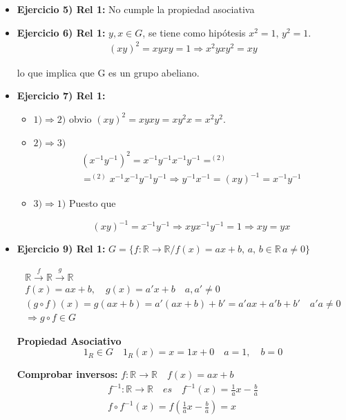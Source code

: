 \documentclass{article}
\begin{document}
\begin{itemize}
\item \textbf{Ejercicio 5) Rel 1:} No cumple la propiedad asociativa
\item \textbf{Ejercicio 6) Rel 1:} $y,x\in G$, se tiene como hipótesis $x^2=1,\, y^2=1$. \\

\begin{gather*}
(xy)^2=xyxy=1 \Rightarrow x^2yxy^2=xy
\end{gather*}

lo que implica que G es un grupo abeliano.

\item \textbf{Ejercicio 7) Rel 1:}
\begin{itemize}
\item $1)\Rightarrow 2)$ obvio $(xy)^2=xyxy=xy^2x=x^2y^2$.
\item $2)\Rightarrow 3)$
	\begin{gather*}
	(x^{-1}y^{-1})^2=x^{-1}y^{-1}x^{-1}y^{-1}=^{(2)} \\
=^{(2)}x^{-1}x^{-1}y^{-1}y^{-1} \Rightarrow y^{-1}x^{-1}=(xy)^{-1}=x^{-1}y^{-1}
	\end{gather*}
\item $3)\Rightarrow 1)$ Puesto que

\begin{equation*}
(xy)^{-1}=x^{-1}y^{-1} \Rightarrow xyx^{-1}y^{-1}=1 \Rightarrow xy=yx
\end{equation*}
\end{itemize}

\item \textbf{Ejercicio 9) Rel 1:} $G=\{f:\mathbb{R}\rightarrow\mathbb{R}/f(x)=ax+b,\,a,\,b\in \mathbb{R}\, a\neq 0\}$ 

\begin{gather*}
\mathbb{R}\xrightarrow{f} \mathbb{R} \xrightarrow{g} \mathbb{R} \\
f(x)=ax+b, \quad g(x)=a'x+b \quad a,a' \neq 0 \\
(g\circ f)(x)=g(ax+b)=a'(ax+b)+b'=a'ax+a'b+b' \quad a'a\neq 0 \\
\Rightarrow g\circ f \in G
\end{gather*}

\textbf{Propiedad Asociativo}
\begin{equation*}
1_R \in G \quad 1_R(x)=x=1x+0 \quad a=1, \quad b=0
\end{equation*}

\textbf{Comprobar inversos:} $f: \mathbb{R} \rightarrow \mathbb{R} \quad f(x)=ax+b$
\begin{gather*}
f^{-1}:\mathbb{R}\rightarrow \mathbb{R}\quad es \quad f^{-1}(x)=\frac{1}{a}x-\frac{b}{a} \\
f\circ f^{-1}(x)=f(\frac{1}{a}x-\frac{b}{a})=x
\end{gather*}


\end{itemize}
\end{document}
